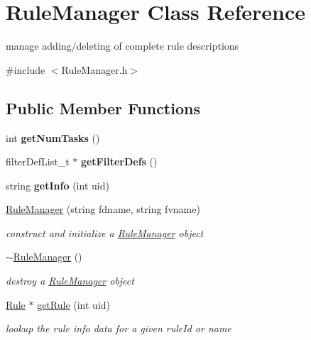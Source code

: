 \hypertarget{classRuleManager}{}\section{Rule\+Manager Class Reference}
\label{classRuleManager}


manage adding/deleting of complete rule descriptions  




{\ttfamily \#include $<$Rule\+Manager.\+h$>$}

\subsection*{Public Member Functions}
\begin{DoxyCompactItemize}
\item 
\mbox{\label{classRuleManager_a21d68fb7fdaa507fafd5ff6099381cc1}} 
int {\bfseries get\+Num\+Tasks} ()
\item 
\mbox{\label{classRuleManager_abea1764880229293d1f864fb0748657f}} 
filter\+Def\+List\+\_\+t $\ast$ {\bfseries get\+Filter\+Defs} ()
\item 
\mbox{\label{classRuleManager_a838212711c14ca2708c861c8a5791807}} 
string {\bfseries get\+Info} (int uid)
\item 
\hyperlink{classRuleManager_a31bcd41f979a78dcdeb9dcfc2460aa15}{Rule\+Manager} (string fdname, string fvname)
\begin{DoxyCompactList}\small\item\em construct and initialize a \hyperlink{classRuleManager}{Rule\+Manager} object \end{DoxyCompactList}\item 
\mbox{\label{classRuleManager_a5c957ab5466f026a427727655c2f577c}} 
\hyperlink{classRuleManager_a5c957ab5466f026a427727655c2f577c}{$\sim$\+Rule\+Manager} ()
\begin{DoxyCompactList}\small\item\em destroy a \hyperlink{classRuleManager}{Rule\+Manager} object \end{DoxyCompactList}\item 
\hyperlink{classRule}{Rule} $\ast$ \hyperlink{classRuleManager_ab081c7bea7b31ff32059c1b470b6208d}{get\+Rule} (int uid)
\begin{DoxyCompactList}\small\item\em lookup the rule info data for a given rule\+Id or name \end{DoxyCompactList}\item 

\end{DoxyCompactItemize}
